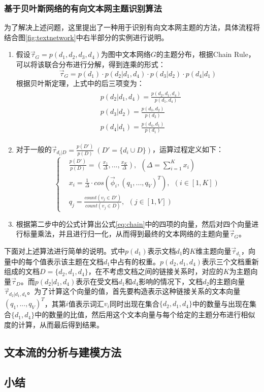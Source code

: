\subsubsection{基于贝叶斯网络的有向文本网主题识别算法}
为了解决上述问题，这里提出了一种用于识别有向文本网主题的方法，具体流程将结合图\ref{fig:textnetwork}中右半部分的实例进行说明。
\begin{enumerate}
\item 假设$\vec{\tau}_G=p(d_1,d_2,d_3,d_4)$为图中文本网络$G$的主题分布，根据Chain Rule，可以将该联合分布进行分解，得到连乘的形式：
\begin{equation}
  \label{eq:chain}
  \vec{\tau}_G=p(d_1)\cdot p(d_2|d_1,d_4)\cdot p(d_3|d_2)\cdot p(d_4|d_1)
\end{equation}
根据贝叶斯定理，上式中的后三项变为：
\begin{eqnarray}
  \begin{aligned}
  & p(d_2|d_1,d_4)=\frac{p(d_2,d_1,d_4)}{p(d_1,d_4)} \\
  & p(d_3|d_2)=\frac{p(d_3,d_2)}{p(d_2)} \\
  & p(d_4|d_1)=\frac{p(d_4,d_1)}{p(d_1)}
  \end{aligned}
\end{eqnarray}
\item 对于一般的$\vec{\tau}_{d_i|D}=\frac{p(D')}{p(D)}~(D'=\{d_i\cup D\})$，运算过程定义如下：
\begin{equation}
  \left\{
  \begin{aligned}
  & \frac{p(D')}{p(D)}=(\frac{x_1}{\Delta},...,\frac{x_K}{\Delta}),~~(\Delta=\sum_{i=1}^{K}x_i) \\
  & x_i=\frac{1}{\Delta}\cdot cos(\vec{\phi}_i,(q_1,...,q_V)^T),~~(i\in [1,K]) \\
  & q_j=\frac{count(v_j\in D')}{count(v_j\in D)},~~(j\in [1,V])
  \end{aligned}
  \right.
\end{equation}
\item 根据第二步中的公式计算出公式\ref{eq:chain}中的四项的向量，然后对四个向量进行标量乘法，并且进行归一化，从而得到最终的文本网络的主题向量$\vec{\tau}_G$。
\end{enumerate}

下面对上述算法进行简单的说明。式中$p(d_1)$表示文档$d_1$的$K$维主题向量$\vec{\tau}_{d_1}$，向量中的每个值表示该主题在文档$d_1$中占有的权重。$p(d_2,d_1,d_4)$表示三个文档重新组成的文档$D=\{d_2,d_1,d_4\}$，在不考虑文档之间的链接关系时，对应的$K$为主题向量$\vec{\tau}_D$。而$p(d_2|d_1,d_4)$表示在受文档$d_1$和$d_4$影响的情况下，文档$d_2$的主题向量$\vec{\tau}_{d_2|d_1,d_4}$。为了计算这个向量的值，首先要构造表示这种链接关系的文本向量$(q_1,...,q_V)^T$，其第$i$值表示词汇$v_i$同时出现在集合$\{d_2,d_1,d_4\}$中的数量与出现在集合$\{d_1,d_4\}$中的数量的比值，然后用这个文本向量与每个给定的主题分布进行相似度的计算，从而最后得到结果。

\subsection{文本流的分析与建模方法}

\subsection{小结}
